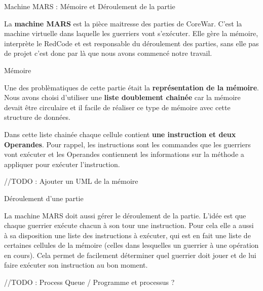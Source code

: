 \documentclass[a4paper, 10pt]{article}
\begin{document}
    \begin{section}{Machine MARS : Mémoire et Déroulement de la partie}
        \par
            La \textbf{machine MARS} est la pièce maitresse des parties de CoreWar. C'est la machine virtuelle dans laquelle les guerriers vont s'exécuter. Elle gère la mémoire, interprète le RedCode et est responsable du déroulement des parties, sans elle pas de projet c'est donc par là que nous avons commencé notre travail. 
            \medskip
        
        \begin{subsection}{Mémoire}
            
            \par
                Une des problèmatiques de cette partie était la \textbf{représentation de la mémoire}.
                Nous avons choisi d'utiliser une \textbf{liste doublement chainée} car la mémoire devait être circulaire et il facile de réaliser ce type de mémoire avec cette structure de données.
                \smallskip
            \par
                Dans cette liste chainée chaque cellule contient \textbf{une instruction et deux Operandes}. Pour rappel, les instructions sont les commandes que les guerriers vont exécuter et les Operandes contiennent les informations sur la méthode a appliquer pour exécuter l'instruction. 
                \medskip
            \par
                //TODO : Ajouter un UML de la mémoire
        \end{subsection}

        \begin{subsection}{Déroulement d'une partie}
            \par
                La machine MARS doit aussi gérer le déroulement de la partie. L'idée est que chaque guerrier exécute chacun à son tour une instruction. Pour cela elle a aussi à sa disposition une liste des instructions à exécuter, qui est en fait une liste de certaines cellules de la mémoire (celles dans lesquelles un guerrier à une opération en cours). Cela permet de facilement déterminer quel guerrier doit jouer et de lui faire exécuter son instruction au bon moment.
            \par
                //TODO : Process Queue / Programme et processus ?
        \end{subsection}
        \bigskip
    \end{section}
\end{document}

